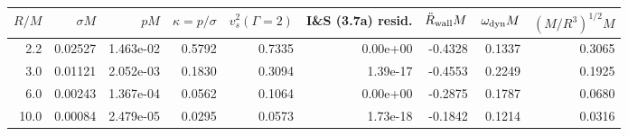 \begin{tabular}{rrrrrrrrr}\toprule
$R/M$ & $\sigma M$ & $pM$ & $\kappa=p/\sigma$ & $v_s^2(\Gamma{=}2)$ & I\&S (3.7a) resid. & $\ddot R_{\rm wall}M$ & $\omega_{\rm dyn}M$ & $(M/R^3)^{1/2}M$\\\midrule
2.2 & 0.02527 & 1.463e-02 & 0.5792 & 0.7335 & 0.00e+00 & -0.4328 & 0.1337 & 0.3065 \\
3.0 & 0.01121 & 2.052e-03 & 0.1830 & 0.3094 & 1.39e-17 & -0.4553 & 0.2249 & 0.1925 \\
6.0 & 0.00243 & 1.367e-04 & 0.0562 & 0.1064 & 0.00e+00 & -0.2875 & 0.1787 & 0.0680 \\
10.0 & 0.00084 & 2.479e-05 & 0.0295 & 0.0573 & 1.73e-18 & -0.1842 & 0.1214 & 0.0316 \\
\bottomrule\end{tabular}
